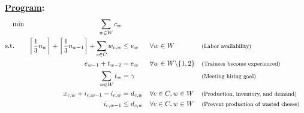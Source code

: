 \documentclass[12pt]{amsart}
\begin{document}
\textbf{\underline{Program}:} \\
\begin{align*}
	\min \hspace{25ex}   \sum_{w\in W}c_w & & & \\
	\text{s.t.} \qquad \left\lceil\frac{1}{3}n_w \right\rceil + \left\lceil\frac{1}{3}n_{w-1} \right\rceil 
	+ \sum_{c\in C}w_{c,w} &\leq e_w & &\forall w\in W & &\text{\footnotesize(Labor availability)} \\
	e_{w-1} + t_{w-2} &= e_w & &\forall w\in W\backslash\{1,2\} & &\text{\footnotesize(Trainees become experienced)} \\
	\sum_{w\in W}t_w &= \gamma && & &\text{\footnotesize(Meeting hiring goal)} \\
	x_{c,w} + i_{c,w-1} - i_{c,w} &= d_{c,w} & &\forall c\in C, w\in W & &\text{\footnotesize(Production, inventory, and demand)} \\
	i_{c,w-1} &\leq d_{c,w} & &\forall c\in C, w\in W & &\text{\footnotesize(Prevent production of wasted cheese)} \\
\end{align*}
\end{document}
